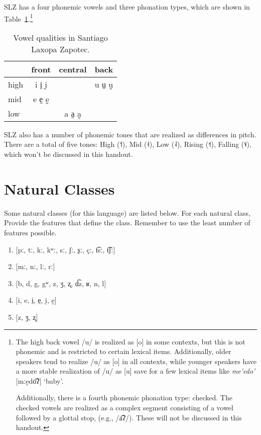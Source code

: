 \documentclass[12pt, letterpaper]{article}
\providecommand{\lsptoprule}{\midrule\toprule}
\providecommand{\lspbottomrule}{\bottomrule\midrule}
\begin{document}
SLZ has a four phonemic vowels and three phonation types, which are shown in Table~\ref{tab:SLZ_vowel_chart}.\footnote{The high back vowel /u/ is realized as [o] in some contexts, but this is not phonemic and is restricted to certain lexical items. Additionally, older speakers tend to realize /u/ as [o] in all contexts, while younger speakers have a more stable realization of /u/ as [u] save for a few lexical items like \textit{me'edo'} [mːḛdo͡ʔ] `baby'.

Additionally, there is a fourth phonemic phonation type: checked. The checked vowels are realized as a complex segment consisting of a vowel followed by a glottal stop, (e.g., /a͡ʔ/). These will not be discussed in this handout.} 

\begin{table}[h!]
    \centering
    \caption{Vowel qualities in Santiago Laxopa Zapotec. }
    \label{tab:SLZ_vowel_chart}
    \begin{tabular}{lccc}
        \lsptoprule
        &  front& central  & back \\
        \midrule 
        high   	&  i i̤ ḭ  &     &   u ṳ ṵ \\
        mid    	&  e e̤ ḛ &   	& 	\\
        low   	&     &  a a̤ a̰ 	&	  \\
        \lspbottomrule
    \end{tabular}
\end{table}

SLZ also has a number of phonemic tones that are realized as differences in pitch. There are a total of five tones: High (˦), Mid (˧), Low (˨), Rising (˧˦), Falling (˦˨), which won't be discussed in this handout. 

\section{Natural Classes} 

Some natural classes (for this language) are listed below. For each natural class, Provide the features that define the class. Remember to use the least number of features possible.

\begin{enumerate}
	\item {}[pː, tː, kː, kʷː, sː, ʃː, ʂː, çː, t͡sː, t͡ʃː] 
	\item {}[mː, nː, lː, rː] 
	\item {}[b, d, g, gʷ, z, ʒ, ʐ, d͡z, ʁ, n, l] 
	\item {}[i, e, i̤, e̤, ḭ, ḛ] 
	\item {}[z, ʒ, ʐ] 
\end{enumerate}
\end{document}
